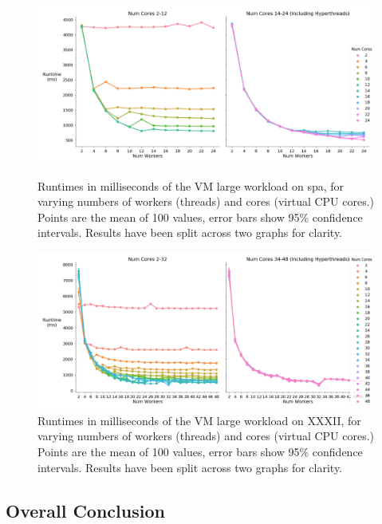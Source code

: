 \begin{figure}[H]
    \vspace*{-2.5cm}
    \centerline{\includegraphics[width=1.5\textwidth]{graphics/optimal_threads/spa/optimal_threads_vm_large.png}}
    \caption{Runtimes in milliseconds of the VM large workload on spa, for varying numbers of workers (threads) and cores (virtual CPU cores.) Points are the mean of 100 values, error bars show 95\% confidence intervals. Results have been split across two graphs for clarity.}
    \label{fig:opt_spa_vm_large}
    
    \centerline{\includegraphics[width=1.5\textwidth]{graphics/optimal_threads/XXXII/optimal_threads_vm_large.png}}
    \caption{Runtimes in milliseconds of the VM large workload on XXXII, for varying numbers of workers (threads) and cores (virtual CPU cores.) Points are the mean of 100 values, error bars show 95\% confidence intervals. Results have been split across two graphs for clarity.}
    \label{fig:opt_xxxii_vm_large}
\end{figure}



\subsection{Overall Conclusion}
\label{section:results:overall_conclusion}

